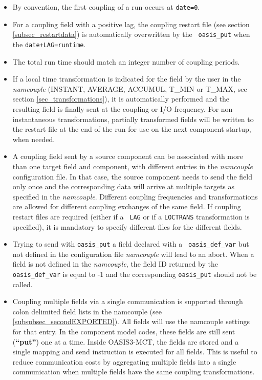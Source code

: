 \begin{itemize}
\item By convention, the first coupling
  of a run occurs at {\tt date=0}.

\item For a coupling
  field with a positive lag, the coupling restart file (see section
  \ref{subsec_restartdata}) is automatically overwritten by the {\tt
    oasis\_put} when the {\tt date+LAG=runtime}.


\item The total run time should match an integer number of coupling
  periods.

\item If a local time transformation is indicated for the field by the
  user in the {\it namcouple} (INSTANT, AVERAGE, ACCUMUL, T\_MIN or
  T\_MAX, see section \ref{sec_transformations}), it is automatically
  performed and the resulting field is finally sent at the coupling or
  I/O frequency.  For non-instantaneous transformations, partially
  transformed fields will be written to the restart file at the end of
  the run for use on the next component startup, when needed.

\item A coupling field sent by a source component can be
  associated with more than one target field and component, with different entries in the {\it namcouple} configuration
  file. In that case, the source component needs to send the field only
  once and the corresponding data will arrive at multiple targets as
  specified in the {\it namcouple}. Different coupling frequencies and
  transformations are allowed for different coupling exchanges of the
  same field. If coupling restart files are required (either if a {\tt
    LAG} or if a {\tt LOCTRANS} transformation is specified), it is
  mandatory to specify different files for the different fields.

\item Trying to send with {\tt oasis\_put} a field declared with a {\tt
  oasis\_def\_var} but not defined in the configuration file {\it
  namcouple} will lead to an abort. When a field is not defined in the {\it namcouple}, the field ID
returned by the {\tt oasis\_def\_var} is equal to -1 and the
corresponding {\tt oasis\_put} should not be called. 

\item Coupling multiple fields via a single communication is supported through colon delimited field lists in the namcouple (see \ref{subsubsec_secondEXPORTED}). 
All fields will use the namcouple settings for that entry. In the component
model codes, these fields are still sent ({\bf “put”}) one at a time. Inside
OASIS3-MCT, the fields are stored and a single mapping and send instruction is executed
for all fields. This is useful to reduce communication costs by aggregating multiple fields into a single communication when multiple fields have the same coupling transformations.


\end{itemize}

